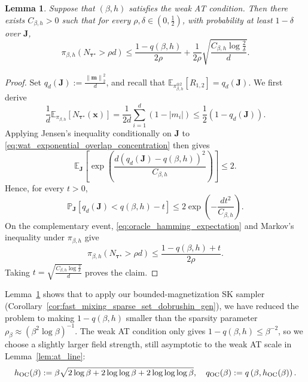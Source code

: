 \documentclass[11pt]{article}
\newtheorem{lemma}{Lemma}
\newcommand{\defeq}{:=}
\newcommand{\norm}[1]{\left\lVert#1\right\rVert}
\newcommand{\half}{\frac{1}{2}}
\newcommand{\1}{\mathbf{1}}
\newcommand{\0}{\mathbf{0}}
\newcommand{\Par}[1]{\left(#1\right)}
\newcommand{\Brack}[1]{\left[#1\right]}
\newcommand{\Abs}[1]{\left|#1\right|}
\newcommand{\twonorm}[1]{\norm{#1}_2}
\newcommand{\vtau}{\boldsymbol{\tau}}
\newcommand{\Prob}{\mathbb{P}}
\renewcommand{\Pr}{\Prob}
\newcommand{\mj}{{\mathbf{J}}}
\newcommand{\vm}{{\mathbf{m}}}
\newcommand{\vx}{{\mathbf{x}}}
\newcommand{\bbE}{{\mathbb{E}}}
\newcommand{\OC}{_{\rm OC}}
\begin{document}
\begin{lemma}\label{lem:oracle_center_condition}
    Suppose that $(\beta,h)$ satisfies the weak AT condition. Then
    there exists $C_{\beta,h}>0$ such that for
    every $\rho,\delta\in(0,\half)$, with probability at least
    $1-\delta$ over $\mj$,
    \begin{equation}
        \label{eq:oracle_center_condition_delta}
        \pi_{\beta,h}
        \Par{
            N_{\vtau^\star}>\rho d
        }
        \le
        \frac{
            1-q(\beta,h)
        }{
            2\rho
        }
        +
        \frac{1}{2\rho}
        \sqrt{
            \frac{
                C_{\beta,h}
                \log\frac{2}{\delta}
            }{d}
        }.
    \end{equation}
\end{lemma}

\begin{proof}
Set \( q_d(\mj) \defeq \frac{\twonorm{\vm}^2}{d}\), and recall that $\bbE_{\pi_{\beta,h}^{\otimes2}}[R_{1,2}] = q_d(\mj)$. We first derive
\begin{equation}
    \label{eq:oracle_hamming_expectation}
    \frac{1}{d}
    \bbE_{\pi_{\beta,h}}
    \Brack{
        N_{\vtau^\star}(\vx)
    }
    =
    \frac{1}{2d}
    \sum_{i=1}^d
    \Par{
        1-\Abs{m_i}
    }
    \le
    \frac{1}{2}
    \Par{
        1 - q_d(\mj)
    }.
\end{equation}
Applying Jensen's inequality conditionally on $\mj$ to
\eqref{eq:wat_exponential_overlap_concentration} then gives
\[
    \bbE_{\mj}
    \Brack{
        \exp\Par{
            \frac{
                d
                \Par{
                    q_d(\mj)-q(\beta,h)
                }^2
            }{
                C_{\beta,h}
            }
        }
    }
    \le
    2.
\]
Hence, for every $t>0$,
\[
    \Pr_{\mj}
    \Brack{
        q_d(\mj)
        <
        q(\beta,h)-t
    }
    \le
    2
    \exp\Par{
        -\frac{dt^2}{C_{\beta,h}}
    }.
\]
On the complementary event,
\eqref{eq:oracle_hamming_expectation} and Markov's inequality under
$\pi_{\beta,h}$ give
\[
    \pi_{\beta,h}
    \Par{
        N_{\vtau^\star}>\rho d
    }
    \le
    \frac{
        1-q(\beta,h)+t
    }{
        2\rho
    }.
\]
Taking \( t = \sqrt{ \frac{ C_{\beta,h} \log\frac{2}{\delta} }{d}}\) proves the claim.
\end{proof}

Lemma~\ref{lem:oracle_center_condition} shows that to apply our bounded-magnetization SK sampler (Corollary~\ref{cor:fast_mixing_sparse_set_dobrushin_gen}), we have reduced the problem to making $1 - q(\beta, h)$ smaller than the sparsity parameter $\rho_\beta \approx (\beta^2 \log \beta)^{-1}$. The weak AT condition only gives $1 - q(\beta, h) \le \beta^{-2}$, so we choose a slightly larger field strength, still asymptotic to the weak AT scale in Lemma~\ref{lem:at_line}:
\begin{equation}
    \label{eq:oracle_field}
    h_{\rm OC}(\beta)
    \defeq
    \beta
    \sqrt{
        2\log\beta
        +
        2\log\log\beta
        +
        2\log\log\log\beta
    },
    \quad
    q\OC(\beta)
    \defeq
    q\Par{
        \beta,
        h_{\rm OC}(\beta)
    }.
\end{equation}
\end{document}
